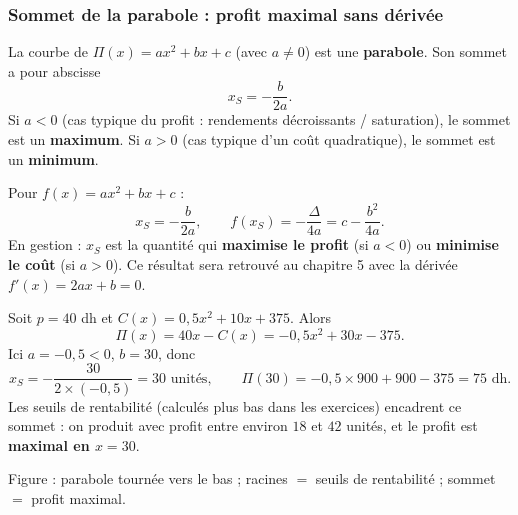 \documentclass[12pt,a4paper]{article}
\begin{document}
\subsubsection{Sommet de la parabole : profit maximal sans dérivée}

La courbe de $\Pi(x)=ax^2+bx+c$ (avec $a\neq 0$) est une \textbf{parabole}. Son sommet a pour abscisse
$$x_S = -\frac{b}{2a}.$$
Si $a<0$ (cas typique du profit : rendements décroissants / saturation), le sommet est un \textbf{maximum}. Si $a>0$ (cas typique d'un coût quadratique), le sommet est un \textbf{minimum}.

\begin{propbox}
Pour $f(x)=ax^2+bx+c$ :
$$x_S = -\frac{b}{2a}, \qquad f(x_S) = -\frac{\Delta}{4a} = c-\frac{b^2}{4a}.$$
En gestion : $x_S$ est la quantité qui \textbf{maximise le profit} (si $a<0$) ou \textbf{minimise le coût} (si $a>0$). Ce résultat sera retrouvé au chapitre 5 avec la dérivée $f'(x)=2ax+b=0$.
\end{propbox}

\begin{exemplebox}
Soit $p=40$ dh et $C(x)=0{,}5x^2+10x+375$. Alors
$$\Pi(x)=40x-C(x)=-0{,}5x^2+30x-375.$$
Ici $a=-0{,}5<0$, $b=30$, donc
$$x_S = -\frac{30}{2\times(-0{,}5)} = 30 \text{ unités}, \qquad \Pi(30)=-0{,}5\times 900+900-375=75 \text{ dh.}$$
Les seuils de rentabilité (calculés plus bas dans les exercices) encadrent ce sommet : on produit avec profit entre environ $18$ et $42$ unités, et le profit est \textbf{maximal en $x=30$}.
\end{exemplebox}

\begin{center}
\end{center}
\begin{center}
{\small\color{mundigray} Figure : parabole tournée vers le bas ; racines $=$ seuils de rentabilité ; sommet $=$ profit maximal.}
\end{center}
\end{document}
